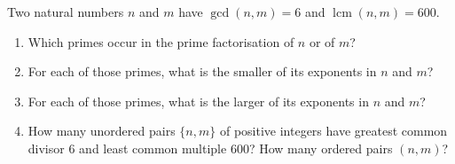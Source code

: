 Two natural numbers $n$ and $m$ have $\gcd(n,m)=6$ and $\operatorname{lcm}(n,m)=600$.
\begin{enumerate}
\item[(a)] Which primes occur in the prime factorisation of $n$ or of $m$?
\item[(b)] For each of those primes, what is the smaller of its exponents in $n$ and $m$?
\item[(c)] For each of those primes, what is the larger of its exponents in $n$ and $m$?
\item[(d)] How many unordered pairs $\{n,m\}$ of positive integers have greatest common divisor $6$ and least common multiple $600$? How many ordered pairs $(n,m)$?
\end{enumerate}
